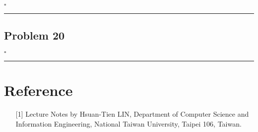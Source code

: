 \documentclass[12pt]{article}
\newcommand*{\QEDB}{\hfill\ensuremath{\square}}
\newcommand{\horrule}[1]{\rule{\linewidth}{#1}}
\begin{document}
\QEDB

\horrule{0.5pt}

\subsection*{Problem 20}

\QEDB

\horrule{0.5pt}

\section*{Reference}

\begin{enumerate}

\item[{[1]}] Lecture Notes by Hsuan-Tien LIN, Department of Computer Science and Information Engineering, National Taiwan University, Taipei 106, Taiwan.

\end{enumerate}
\end{document}
